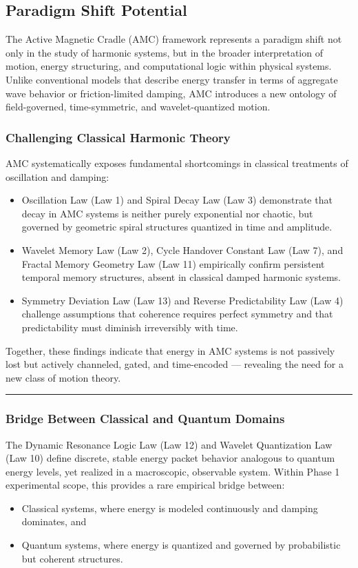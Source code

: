 \documentclass[10pt,aps,pre,onecolumn,superscriptaddress,notitlepage]{revtex4-2}
\begin{document}
 \subsection{Paradigm Shift Potential}
 \label{sec:ParadigmShiftPotential}
 The Active Magnetic Cradle (AMC) framework represents a paradigm shift not only in the study of harmonic systems, but in the broader interpretation of motion, energy structuring, and computational logic within physical systems. Unlike conventional models that describe energy transfer in terms of aggregate wave behavior or friction-limited damping, AMC introduces a new ontology of field-governed, time-symmetric, and wavelet-quantized motion.
\subsubsection{Challenging Classical Harmonic Theory}
AMC systematically exposes fundamental shortcomings in classical treatments of oscillation and damping:
\begin{itemize}
    \item Oscillation Law (Law 1) and Spiral Decay Law (Law 3) demonstrate that decay in AMC systems is neither purely exponential nor chaotic, but governed by geometric spiral structures quantized in time and amplitude.
    \item Wavelet Memory Law (Law 2), Cycle Handover Constant Law (Law 7), and Fractal Memory Geometry Law (Law 11) empirically confirm persistent temporal memory structures, absent in classical damped harmonic systems.
    \item Symmetry Deviation Law (Law 13) and Reverse Predictability Law (Law 4) challenge assumptions that coherence requires perfect symmetry and that predictability must diminish irreversibly with time.
\end{itemize}

Together, these findings indicate that energy in AMC systems is not passively lost but actively channeled, gated, and time-encoded — revealing the need for a new class of motion theory. 
\vspace{1em}
\hrule
\vspace{1em}
\subsubsection{Bridge Between Classical and Quantum Domains}
The Dynamic Resonance Logic Law (Law 12) and Wavelet Quantization Law (Law 10) define discrete, stable energy packet behavior analogous to quantum energy levels, yet realized in a macroscopic, observable system. Within Phase 1 experimental scope, this provides a rare empirical bridge between:
\begin{itemize}
    \item Classical systems, where energy is modeled continuously and damping dominates, and
    \item Quantum systems, where energy is quantized and governed by probabilistic but coherent structures.
\end{itemize}
\end{document}
